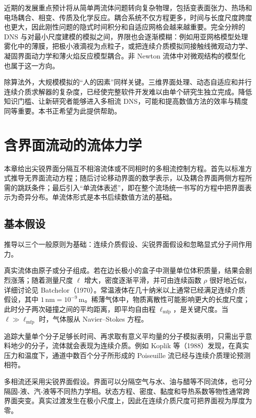 \documentclass[11pt,a4paper,openany,fontset=none]{ctexbook}
\begin{document}
近期的发展重点预计将从简单两流体问题转向复杂物理，包括变表面张力、热场和电场耦合、相变、传质及化学反应。耦合系统不仅方程更多，时间与长度尺度跨度也更大，因此刚性问题的隐式时间积分和自适应网格会越来越重要。完全分辨的 DNS 与对最小尺度建模的模拟之间，界限也会逐渐模糊：例如用亚网格模型处理雾化中的薄膜，把极小液滴视为点粒子，或把连续介质模拟同接触线微观动力学、凝固界面动力学和薄火焰反应模型耦合。非 Newton 流体中对微观结构的模型化也属于这一方向。

\enlargethispage{2\baselineskip}
除算法外，大规模模拟的“人的因素”同样关键。三维界面处理、动态自适应和并行连续介质求解器的复杂度，已经使完整软件开发难以由单个研究生独立完成。降低知识门槛、让新研究者能够进入多相流 DNS，可能和提高数值方法的效率与精度同等重要。本书正希望为此提供帮助。

\chapter{含界面流动的流体力学}


本章给出尖锐界面分隔互不相溶流体或不同相时的多相流控制方程。首先以标准方式推导无界面流动方程；随后讨论移动界面的数学表示，以及耦合界面两侧方程所需的跳跃条件；最后引入“单流体表述”，即在整个流场统一书写的方程中把界面表示为奇异分布。单流体形式是本书后续数值方法的基础。

\section{基本假设}

推导以三个一般原则为基础：连续介质假设、尖锐界面假设和忽略显式分子间作用力。

真实流体由原子或分子组成。若在边长极小的盒子中测量单位体积质量，结果会剧烈涨落；随着测量尺度 $\ell$ 增大，密度逐渐平滑，并可由连续函数 $\rho$ 很好地近似，详细讨论见 Batchelor（1970）。常温液体在几十纳米以上通常已经满足连续介质假设，其中 $1\,\mathrm{nm}=10^{-9}\,\mathrm m$。稀薄气体中，物质离散性可能影响更大的长度尺度；此时分子两次碰撞之间的平均距离，即平均自由程 $\ell_{\mathrm{mfp}}$，是关键尺度。当 $\ell\gg\ell_{\mathrm{mfp}}$ 时，气体服从 Navier--Stokes 方程。

追踪大量单个分子足够长时间、再求取有意义平均量的分子模拟表明，只需出乎意料地少的分子，流体就会表现为连续介质。例如 Koplik 等（1988）发现，在真实压力和温度下，通道中数百个分子所形成的 Poiseuille 流已经与连续介质理论预测相符。

多相流还采用尖锐界面假设。界面可以分隔空气与水、油与醋等不同流体，也可分隔固-液、汽-液等不同热力学相。状态方程、密度、黏度和导热系数等物性通常跨界面突变。真实过渡发生在极小尺度上，因此在连续介质尺度可把界面视为厚度为零。
\end{document}
